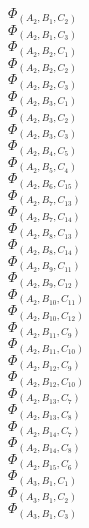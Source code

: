 \documentclass[14pt]{article}
\begin{document}
    $\Phi_{({A}_{2}, {B}_{1}, {C}_{2})}$ \\ 
    $\Phi_{({A}_{2}, {B}_{1}, {C}_{3})}$ \\ 
    $\Phi_{({A}_{2}, {B}_{2}, {C}_{1})}$ \\ 
    $\Phi_{({A}_{2}, {B}_{2}, {C}_{2})}$ \\ 
    $\Phi_{({A}_{2}, {B}_{2}, {C}_{3})}$ \\ 
    $\Phi_{({A}_{2}, {B}_{3}, {C}_{1})}$ \\ 
    $\Phi_{({A}_{2}, {B}_{3}, {C}_{2})}$ \\ 
    $\Phi_{({A}_{2}, {B}_{3}, {C}_{3})}$ \\ 
    $\Phi_{({A}_{2}, {B}_{4}, {C}_{5})}$ \\ 
    $\Phi_{({A}_{2}, {B}_{5}, {C}_{4})}$ \\ 
    $\Phi_{({A}_{2}, {B}_{6}, {C}_{15})}$ \\ 
    $\Phi_{({A}_{2}, {B}_{7}, {C}_{13})}$ \\ 
    $\Phi_{({A}_{2}, {B}_{7}, {C}_{14})}$ \\ 
    $\Phi_{({A}_{2}, {B}_{8}, {C}_{13})}$ \\ 
    $\Phi_{({A}_{2}, {B}_{8}, {C}_{14})}$ \\ 
    $\Phi_{({A}_{2}, {B}_{9}, {C}_{11})}$ \\ 
    $\Phi_{({A}_{2}, {B}_{9}, {C}_{12})}$ \\ 
    $\Phi_{({A}_{2}, {B}_{10}, {C}_{11})}$ \\ 
    $\Phi_{({A}_{2}, {B}_{10}, {C}_{12})}$ \\ 
    $\Phi_{({A}_{2}, {B}_{11}, {C}_{9})}$ \\ 
    $\Phi_{({A}_{2}, {B}_{11}, {C}_{10})}$ \\ 
    $\Phi_{({A}_{2}, {B}_{12}, {C}_{9})}$ \\ 
    $\Phi_{({A}_{2}, {B}_{12}, {C}_{10})}$ \\ 
    $\Phi_{({A}_{2}, {B}_{13}, {C}_{7})}$ \\ 
    $\Phi_{({A}_{2}, {B}_{13}, {C}_{8})}$ \\ 
    $\Phi_{({A}_{2}, {B}_{14}, {C}_{7})}$ \\ 
    $\Phi_{({A}_{2}, {B}_{14}, {C}_{8})}$ \\ 
    $\Phi_{({A}_{2}, {B}_{15}, {C}_{6})}$ \\ 
    $\Phi_{({A}_{3}, {B}_{1}, {C}_{1})}$ \\ 
    $\Phi_{({A}_{3}, {B}_{1}, {C}_{2})}$ \\ 
    $\Phi_{({A}_{3}, {B}_{1}, {C}_{3})}$ \\ 
\end{document}
